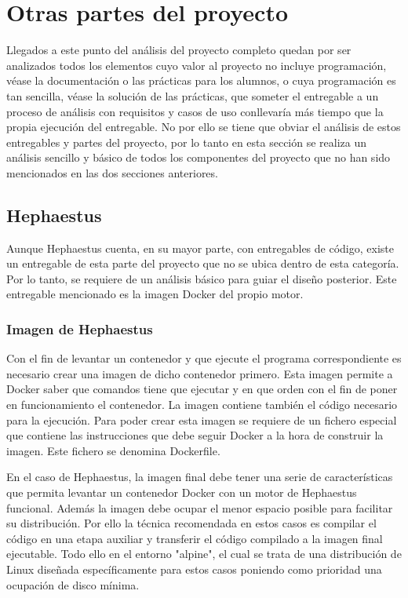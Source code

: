 \section{Otras partes del proyecto}

Llegados a este punto del análisis del proyecto completo quedan por ser analizados todos los elementos cuyo valor al proyecto no incluye programación, véase la documentación o las prácticas para los alumnos, o cuya programación es tan sencilla, véase la solución de las prácticas, que someter el entregable a un proceso de análisis con requisitos y casos de uso conllevaría más tiempo que la propia ejecución del entregable. No por ello se tiene que obviar el análisis de estos entregables y partes del proyecto, por lo tanto en esta sección se realiza un análisis sencillo y básico de todos los componentes del proyecto que no han sido mencionados en las dos secciones anteriores.

\subsection{Hephaestus}

Aunque Hephaestus cuenta, en su mayor parte, con entregables de código, existe un entregable de esta parte del proyecto que no se ubica dentro de esta categoría. Por lo tanto, se requiere de un análisis básico para guiar el diseño posterior. Este entregable mencionado es la imagen Docker del propio motor.

\subsubsection{Imagen de Hephaestus}

Con el fin de levantar un contenedor y que ejecute el programa correspondiente es necesario crear una imagen de dicho contenedor primero. Esta imagen permite a Docker saber que comandos tiene que ejecutar y en que orden con el fin de poner en funcionamiento el contenedor. La imagen contiene también el código necesario para la ejecución. Para poder crear esta imagen se requiere de un fichero especial que contiene las instrucciones que debe seguir Docker a la hora de construir la imagen. Este fichero se denomina Dockerfile.

En el caso de Hephaestus, la imagen final debe tener una serie de características que permita levantar un contenedor Docker con un motor de Hephaestus funcional. Además la imagen debe ocupar el menor espacio posible para facilitar su distribución. Por ello la técnica recomendada en estos casos es compilar el código en una etapa auxiliar y transferir el código compilado a la imagen final ejecutable. Todo ello en el entorno "alpine", el cual se trata de una distribución de Linux diseñada específicamente para estos casos poniendo como prioridad una ocupación de disco mínima.

